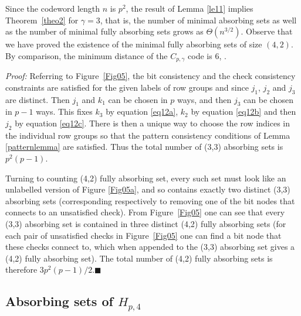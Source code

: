 {%

Since the codeword length $n$ is $p^2$, the result of Lemma
\ref{le11} implies Theorem~\ref{theo2} for $\gamma=3$, that is, the
number of minimal absorbing sets as well as the number of minimal
fully absorbing sets grows as $\Theta(n^{3/2})$. Observe that we
have proved  the existence of the minimal fully absorbing sets of
size $(4,2)$. By comparison, the minimum distance of the
$C_{p,\gamma}$ code is $6$, \cite{helles}. } %

\noindent \textit{Proof:} Referring to Figure~\ref{Fig05}, the bit
consistency and the check consistency constraints are satisfied for
the given labels of row groups and since $j_1$, $j_2$ and $j_3$ are
distinct. Then $j_1$ and $k_1$ can be chosen in $p$ ways, and then
$j_3$ can be chosen in $p-1$ ways. This fixes $k_3$ by equation
\eqref{eq12a}, $k_2$ by equation \eqref{eq12b} and then $j_2$ by
equation \eqref{eq12c}. There is then a unique way to choose the row
indices in the individual row groups so that the pattern consistency
conditions of Lemma \ref{patternlemma} are satisfied. Thus the total
number of (3,3) absorbing sets is $p^2(p-1)$.

Turning to counting (4,2) fully absorbing set, every such set must
look like an unlabelled version of Figure \ref{Fig05a}, and so
contains exactly two distinct (3,3) absorbing sets (corresponding
respectively to removing one of the bit nodes that connects to an
unsatisfied check). From Figure~\ref{Fig05} one can see that every
(3,3) absorbing set is contained in three distinct (4,2) fully
absorbing sets (for each pair of unsatisfied checks in
Figure~\ref{Fig05} one can find a bit node that these checks connect
to, which when appended to the (3,3) absorbing set gives a (4,2)
fully absorbing set). The total number of (4,2) fully absorbing sets
is therefore $3p^2(p-1)/2$.\hfill$\blacksquare$
\subsection{Absorbing sets of $H_{p,4}$}\label{theo14}



